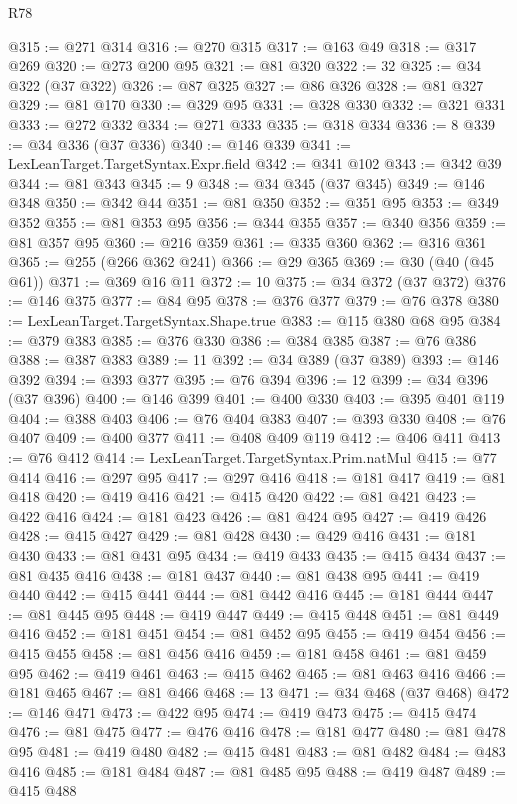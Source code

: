 \begin{lexlean}{R78}
\begin{coremodule}
@315 := @271 @314
@316 := @270 @315
@317 := @163 @49
@318 := @317 @269
@320 := @273 @200 @95
@321 := @81 @320
@322 := 32
@325 := @34 @322 (@37 @322)
@326 := @87 @325
@327 := @86 @326
@328 := @81 @327
@329 := @81 @170
@330 := @329 @95
@331 := @328 @330
@332 := @321 @331
@333 := @272 @332
@334 := @271 @333
@335 := @318 @334
@336 := 8
@339 := @34 @336 (@37 @336)
@340 := @146 @339
@341 := LexLeanTarget.TargetSyntax.Expr.field
@342 := @341 @102
@343 := @342 @39
@344 := @81 @343
@345 := 9
@348 := @34 @345 (@37 @345)
@349 := @146 @348
@350 := @342 @44
@351 := @81 @350
@352 := @351 @95
@353 := @349 @352
@355 := @81 @353 @95
@356 := @344 @355
@357 := @340 @356
@359 := @81 @357 @95
@360 := @216 @359
@361 := @335 @360
@362 := @316 @361
@365 := @255 (@266 @362 @241)
@366 := @29 @365
@369 := @30 (@40 (@45 @61))
@371 := @369 @16 @11
@372 := 10
@375 := @34 @372 (@37 @372)
@376 := @146 @375
@377 := @84 @95
@378 := @376 @377
@379 := @76 @378
@380 := LexLeanTarget.TargetSyntax.Shape.true
@383 := @115 @380 @68 @95
@384 := @379 @383
@385 := @376 @330
@386 := @384 @385
@387 := @76 @386
@388 := @387 @383
@389 := 11
@392 := @34 @389 (@37 @389)
@393 := @146 @392
@394 := @393 @377
@395 := @76 @394
@396 := 12
@399 := @34 @396 (@37 @396)
@400 := @146 @399
@401 := @400 @330
@403 := @395 @401 @119
@404 := @388 @403
@406 := @76 @404 @383
@407 := @393 @330
@408 := @76 @407
@409 := @400 @377
@411 := @408 @409 @119
@412 := @406 @411
@413 := @76 @412
@414 := LexLeanTarget.TargetSyntax.Prim.natMul
@415 := @77 @414
@416 := @297 @95
@417 := @297 @416
@418 := @181 @417
@419 := @81 @418
@420 := @419 @416
@421 := @415 @420
@422 := @81 @421
@423 := @422 @416
@424 := @181 @423
@426 := @81 @424 @95
@427 := @419 @426
@428 := @415 @427
@429 := @81 @428
@430 := @429 @416
@431 := @181 @430
@433 := @81 @431 @95
@434 := @419 @433
@435 := @415 @434
@437 := @81 @435 @416
@438 := @181 @437
@440 := @81 @438 @95
@441 := @419 @440
@442 := @415 @441
@444 := @81 @442 @416
@445 := @181 @444
@447 := @81 @445 @95
@448 := @419 @447
@449 := @415 @448
@451 := @81 @449 @416
@452 := @181 @451
@454 := @81 @452 @95
@455 := @419 @454
@456 := @415 @455
@458 := @81 @456 @416
@459 := @181 @458
@461 := @81 @459 @95
@462 := @419 @461
@463 := @415 @462
@465 := @81 @463 @416
@466 := @181 @465
@467 := @81 @466
@468 := 13
@471 := @34 @468 (@37 @468)
@472 := @146 @471
@473 := @422 @95
@474 := @419 @473
@475 := @415 @474
@476 := @81 @475
@477 := @476 @416
@478 := @181 @477
@480 := @81 @478 @95
@481 := @419 @480
@482 := @415 @481
@483 := @81 @482
@484 := @483 @416
@485 := @181 @484
@487 := @81 @485 @95
@488 := @419 @487
@489 := @415 @488

\end{coremodule}
\end{lexlean}
